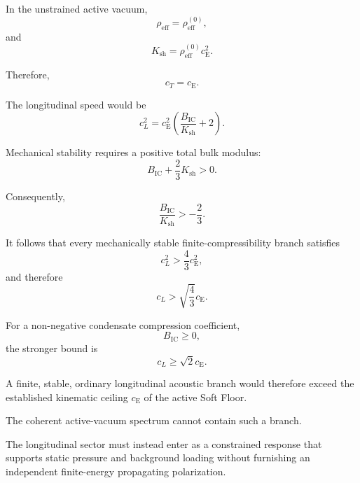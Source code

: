 In the unstrained active vacuum,
\begin{equation}
    \rho_{\mathrm{eff}} = \rho_{\mathrm{eff}}^{(0)},
\end{equation}
and
\begin{equation}
    K_{\mathrm{sh}} = \rho_{\mathrm{eff}}^{(0)}c_{\mathrm{E}}^2.
\end{equation}

Therefore,
\begin{equation}
    c_T = c_{\mathrm{E}}.
\end{equation}

The longitudinal speed would be
\begin{equation}
    c_L^2 = c_{\mathrm{E}}^2 \left( \frac{ B_{\mathrm{IC}} }{ K_{\mathrm{sh}} } + 2 \right).
\end{equation}

Mechanical stability requires a positive total bulk modulus:
\begin{equation}
    B_{\mathrm{IC}} + \frac{2}{3}K_{\mathrm{sh}} > 0.
\end{equation}

Consequently,
\begin{equation}
    \frac{ B_{\mathrm{IC}} }{ K_{\mathrm{sh}} } > -\frac{2}{3}.
\end{equation}

It follows that every mechanically stable finite-compressibility branch satisfies
\begin{equation}
    c_L^2 > \frac{4}{3}c_{\mathrm{E}}^2,
\end{equation}
and therefore
\begin{equation}
    \boxed{ c_L > \sqrt{\frac{4}{3}} c_{\mathrm{E}} }.
\end{equation}

For a non-negative condensate compression coefficient,
\begin{equation}
    B_{\mathrm{IC}} \geq 0,
\end{equation}
the stronger bound is
\begin{equation}
    c_L \geq \sqrt{2}c_{\mathrm{E}}.
\end{equation}

A finite, stable, ordinary longitudinal acoustic branch would therefore exceed the established kinematic ceiling $c_{\mathrm{E}}$ of the active Soft Floor.

The coherent active-vacuum spectrum cannot contain such a branch.

The longitudinal sector must instead enter as a constrained response that supports static pressure and background loading without furnishing an independent finite-energy propagating polarization.

